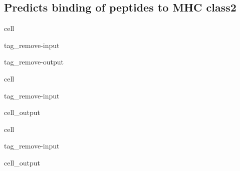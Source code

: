 \documentclass[letterpaper,10pt,english]{jupyterBook}
\begin{document}
\subsection{Predicts binding of peptides to MHC class2}
\label{\detokenize{ipynb/chapter2:predicts-binding-of-peptides-to-mhc-class2}}
\begin{sphinxuseclass}{cell}
\begin{sphinxuseclass}{tag_remove-input}
\begin{sphinxuseclass}{tag_remove-output}
\end{sphinxuseclass}
\end{sphinxuseclass}
\end{sphinxuseclass}
\begin{sphinxuseclass}{cell}
\begin{sphinxuseclass}{tag_remove-input}\begin{sphinxVerbatimOutput}

\begin{sphinxuseclass}{cell_output}
\noindent{}

\end{sphinxuseclass}\end{sphinxVerbatimOutput}

\end{sphinxuseclass}
\end{sphinxuseclass}
\begin{sphinxuseclass}{cell}
\begin{sphinxuseclass}{tag_remove-input}\begin{sphinxVerbatimOutput}

\begin{sphinxuseclass}{cell_output}
\noindent{}

\end{sphinxuseclass}\end{sphinxVerbatimOutput}

\end{sphinxuseclass}
\end{sphinxuseclass}
\end{document}
